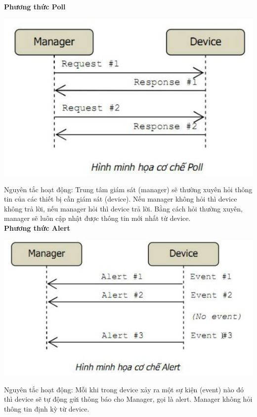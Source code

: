 \documentclass[12pt,oneside,a4paper]{article}
\begin{document}
\textbf{Phương thức Poll}\\

\begin{center}
	\includegraphics[scale=0.5]{images/poll.jpg}
\end{center}

Nguyên tắc hoạt động: Trung tâm giám sát (manager) sẽ thường xuyên hỏi thông tin của các thiết bị cần giám sát (device). Nếu manager không hỏi thì device không trả lời, nếu manager hỏi thì device trả lời. Bằng cách hỏi thường xuyên, manager sẽ luôn cập nhật được thông tin mới nhất từ device.\\

\textbf{Phương thức Alert}\\
\begin{center}
	\includegraphics[scale=0.5]{images/alert.jpg}
\end{center}
Nguyên tắc hoạt động: Mỗi khi trong device xảy ra một sự kiện (event) nào đó thì device sẽ tự động gửi thông báo cho Manager, gọi là alert. Manager không hỏi thông tin định kỳ từ device.\\
\end{document}

